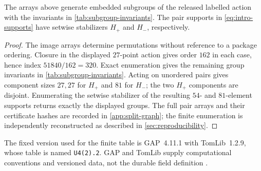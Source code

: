 \begin{lemma}
\label{lem:embedded-subgroups}
The arrays above generate embedded subgroups of the released labelled action
with the invariants in \cref{tab:subgroup-invariants}.  The pair supports in
\eqref{eq:intro-supports} have setwise stabilizers $H_+$ and $H_-$,
respectively.
\end{lemma}

\begin{proof}
The image arrays determine permutations without reference to a package
ordering.  Closure in the displayed $27$-point action gives order $162$ in
each case, hence index $51840/162=320$.  Exact enumeration gives the
remaining group invariants in \cref{tab:subgroup-invariants}.  Acting on
unordered pairs gives component sizes $27,27$ for $H_+$ and $81$ for $H_-$;
the two $H_+$ components are disjoint.  Enumerating the setwise stabilizer of
the resulting $54$- and $81$-element supports returns exactly the displayed
groups.  The full pair arrays and their certificate hashes are recorded in
\cref{app:split-graph}; the finite enumeration is independently reconstructed
as described in \cref{sec:reproducibility}.
\end{proof}

The fixed version used for the finite table is GAP~4.11.1 with TomLib~1.2.9,
whose table is named \texttt{U4(2).2}.  GAP and TomLib supply computational
conventions and versioned data, not the durable field definition
\citep{gap2021,tomlib2019}.

